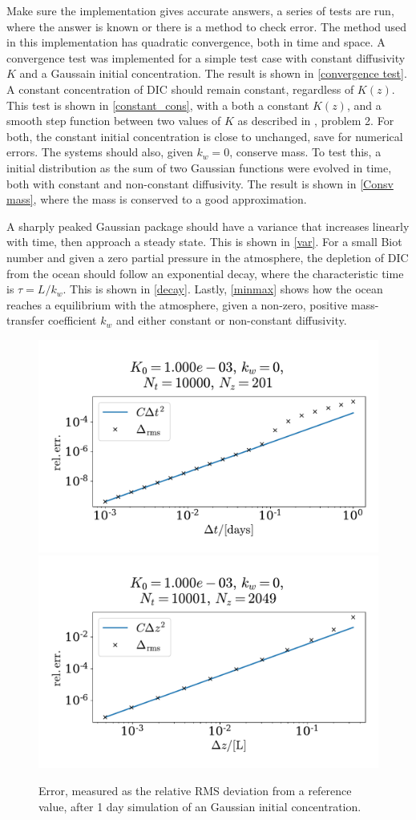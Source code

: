 \documentclass{article}
\begin{document}
    Make sure the implementation gives accurate answers, a series of tests are run, where the answer is known or there is a method to check error.
    The method used in this implementation has quadratic convergence, both in time and space.
    A convergence test was implemented for a simple test case with constant diffusivity $K$ and a Gaussain initial concentration.
    The result is shown in \autoref{convergence test}.
    A constant concentration of DIC should remain constant, regardless of $K(z)$.
    This test is shown in \autoref{constant_cons}, with a both a constant $K(z)$, and a smooth step function between two values of $K$ as described in \cite{exercise}, problem 2.
    For both, the constant initial concentration is close to unchanged, save for numerical errors.
    The systems should also, given $k_w=0$, conserve mass.
    To test this, a initial distribution as the sum of two Gaussian functions were evolved in time, both with constant and non-constant diffusivity.
    The result is shown in \autoref{Consv mass}, where the mass is conserved to a good approximation.

    A sharply peaked Gaussian package should have a variance that increases linearly with time, then approach a steady state.
    This is shown in \autoref{var}.
    For a small Biot number and given a zero partial pressure in the atmosphere, the depletion of DIC from the ocean should follow an exponential decay, where the characteristic time is $\tau = L/k_w$.
    This is shown in \autoref{decay}.
    Lastly, \autoref{minmax} shows how the ocean reaches a equilibrium with the atmosphere, given a non-zero, positive mass-transfer coefficient $k_w$ and either constant or non-constant diffusivity.
    
    
    \begin{figure}[H]
        \centering
        \includegraphics[width=.49\textwidth]{../plots/conv_test_t}
        \includegraphics[width=.49\textwidth]{../plots/conv_test_z}
        \caption{Error, measured as the relative RMS deviation from a reference value, after 1 day simulation of an Gaussian initial concentration.}
        \label{convergence test}
    \end{figure}
\end{document}

